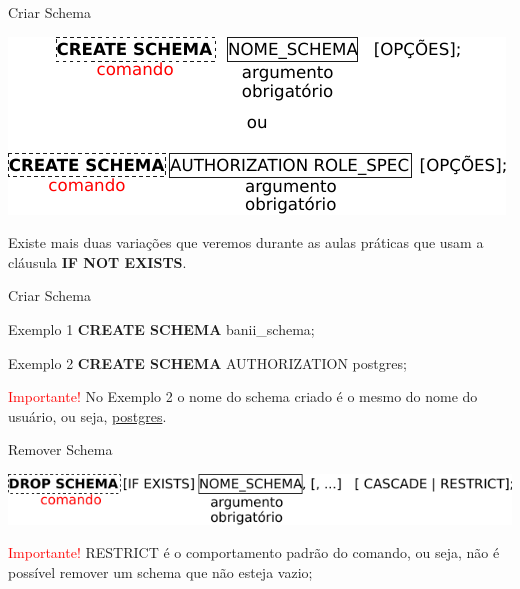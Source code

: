 \documentclass[xcolor=x11names,compress]{beamer}
\begin{document}
\begin{frame}{Criar Schema}

\centering \includegraphics[keepaspectratio,width=\textwidth]{create_schema}

\pause

\begin{block}{}
\centering Existe mais duas variações que veremos durante as aulas práticas que usam a cláusula \textbf{IF NOT EXISTS}.
\end{block}

\end{frame}

\begin{frame}{Criar Schema}

\begin{alertblock}{Exemplo 1}
\textbf{CREATE SCHEMA} banii\_schema;
\end{alertblock}

\begin{alertblock}{Exemplo 2}
\textbf{CREATE SCHEMA} AUTHORIZATION postgres;
\end{alertblock}

\pause 

\begin{alertblock}{\centering \textcolor{red}{Importante!}}
No Exemplo 2 o nome do schema criado é o mesmo do nome do usuário, ou seja, \underline{postgres}.
\end{alertblock}

\end{frame}

\begin{frame}{Remover Schema}

\centering \includegraphics[keepaspectratio,width=\textwidth]{drop_schema}

\pause 

\begin{alertblock}{\centering \textcolor{red}{Importante!}}
RESTRICT é o comportamento padrão do comando, ou seja, não é possível remover um schema que não esteja vazio;
\end{alertblock}

\end{frame}
\end{document}
